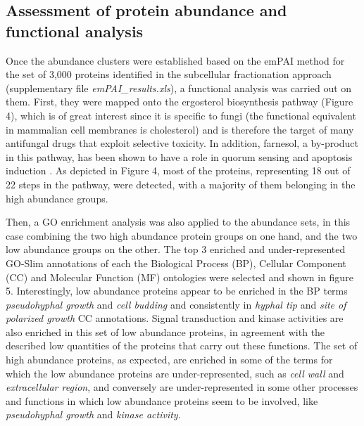 \subsection*{Assessment of protein abundance and functional analysis}

Once the abundance clusters were established based on the emPAI method for the set of
3,000 proteins identified in the subcellular fractionation approach (supplementary file
\textit{emPAI\_results.xls}), a functional analysis was carried out on them. First, they were mapped
onto the ergosterol biosynthesis pathway (Figure 4), which is of great interest since it is
specific to fungi (the functional equivalent in mammalian cell membranes is cholesterol) and
is therefore the target of many antifungal drugs that exploit selective toxicity. In addition,
farnesol, a by-product in this pathway, has been shown to have a role in quorum sensing \citep{Albuquerque2012}
and apoptosis induction \citep{Leger2015}. As depicted in Figure 4, most of the proteins, representing 18
out of 22 steps in the pathway, were detected, with a majority of them belonging in the high
abundance groups.






Then, a GO enrichment analysis was also applied to the abundance sets, in this case
combining the two high abundance protein groups on one hand, and the two low abundance
groups on the other. The top 3 enriched and under-represented GO-Slim annotations of each
the Biological Process (BP), Cellular Component (CC) and Molecular Function (MF)
ontologies were selected and shown in figure 5. Interestingly, low abundance proteins appear
to be enriched in the BP terms \textit{pseudohyphal growth} and \textit{cell budding} and consistently in
\textit{hyphal tip} and \textit{site of polarized growth} CC annotations. Signal transduction and kinase
activities are also enriched in this set of low abundance proteins, in agreement with the
described low quantities of the proteins that carry out these functions. The set of high
abundance proteins, as expected, are enriched in some of the terms for which the low
abundance proteins are under-represented, such as \textit{cell wall} and \textit{extracellular region}, and
conversely are under-represented in some other processes and functions in which low
abundance proteins seem to be involved, like \textit{pseudohyphal growth} and \textit{kinase activity}.









